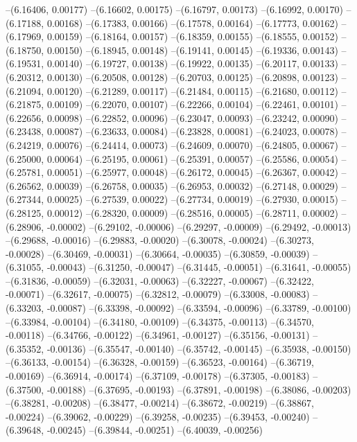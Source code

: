 --(6.16406, 0.00177)
--(6.16602, 0.00175)
--(6.16797, 0.00173)
--(6.16992, 0.00170)
--(6.17188, 0.00168)
--(6.17383, 0.00166)
--(6.17578, 0.00164)
--(6.17773, 0.00162)
--(6.17969, 0.00159)
--(6.18164, 0.00157)
--(6.18359, 0.00155)
--(6.18555, 0.00152)
--(6.18750, 0.00150)
--(6.18945, 0.00148)
--(6.19141, 0.00145)
--(6.19336, 0.00143)
--(6.19531, 0.00140)
--(6.19727, 0.00138)
--(6.19922, 0.00135)
--(6.20117, 0.00133)
--(6.20312, 0.00130)
--(6.20508, 0.00128)
--(6.20703, 0.00125)
--(6.20898, 0.00123)
--(6.21094, 0.00120)
--(6.21289, 0.00117)
--(6.21484, 0.00115)
--(6.21680, 0.00112)
--(6.21875, 0.00109)
--(6.22070, 0.00107)
--(6.22266, 0.00104)
--(6.22461, 0.00101)
--(6.22656, 0.00098)
--(6.22852, 0.00096)
--(6.23047, 0.00093)
--(6.23242, 0.00090)
--(6.23438, 0.00087)
--(6.23633, 0.00084)
--(6.23828, 0.00081)
--(6.24023, 0.00078)
--(6.24219, 0.00076)
--(6.24414, 0.00073)
--(6.24609, 0.00070)
--(6.24805, 0.00067)
--(6.25000, 0.00064)
--(6.25195, 0.00061)
--(6.25391, 0.00057)
--(6.25586, 0.00054)
--(6.25781, 0.00051)
--(6.25977, 0.00048)
--(6.26172, 0.00045)
--(6.26367, 0.00042)
--(6.26562, 0.00039)
--(6.26758, 0.00035)
--(6.26953, 0.00032)
--(6.27148, 0.00029)
--(6.27344, 0.00025)
--(6.27539, 0.00022)
--(6.27734, 0.00019)
--(6.27930, 0.00015)
--(6.28125, 0.00012)
--(6.28320, 0.00009)
--(6.28516, 0.00005)
--(6.28711, 0.00002)
--(6.28906, -0.00002)
--(6.29102, -0.00006)
--(6.29297, -0.00009)
--(6.29492, -0.00013)
--(6.29688, -0.00016)
--(6.29883, -0.00020)
--(6.30078, -0.00024)
--(6.30273, -0.00028)
--(6.30469, -0.00031)
--(6.30664, -0.00035)
--(6.30859, -0.00039)
--(6.31055, -0.00043)
--(6.31250, -0.00047)
--(6.31445, -0.00051)
--(6.31641, -0.00055)
--(6.31836, -0.00059)
--(6.32031, -0.00063)
--(6.32227, -0.00067)
--(6.32422, -0.00071)
--(6.32617, -0.00075)
--(6.32812, -0.00079)
--(6.33008, -0.00083)
--(6.33203, -0.00087)
--(6.33398, -0.00092)
--(6.33594, -0.00096)
--(6.33789, -0.00100)
--(6.33984, -0.00104)
--(6.34180, -0.00109)
--(6.34375, -0.00113)
--(6.34570, -0.00118)
--(6.34766, -0.00122)
--(6.34961, -0.00127)
--(6.35156, -0.00131)
--(6.35352, -0.00136)
--(6.35547, -0.00140)
--(6.35742, -0.00145)
--(6.35938, -0.00150)
--(6.36133, -0.00154)
--(6.36328, -0.00159)
--(6.36523, -0.00164)
--(6.36719, -0.00169)
--(6.36914, -0.00174)
--(6.37109, -0.00178)
--(6.37305, -0.00183)
--(6.37500, -0.00188)
--(6.37695, -0.00193)
--(6.37891, -0.00198)
--(6.38086, -0.00203)
--(6.38281, -0.00208)
--(6.38477, -0.00214)
--(6.38672, -0.00219)
--(6.38867, -0.00224)
--(6.39062, -0.00229)
--(6.39258, -0.00235)
--(6.39453, -0.00240)
--(6.39648, -0.00245)
--(6.39844, -0.00251)
--(6.40039, -0.00256)
